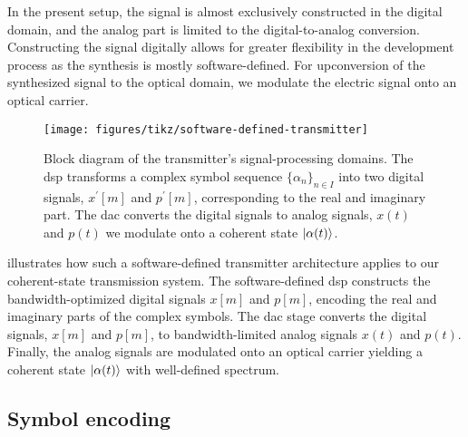 In the present setup, the signal is almost exclusively constructed in the digital domain, and the analog part is limited to the digital-to-analog conversion.
Constructing the signal digitally allows for greater flexibility in the development process as the synthesis is mostly software-defined.
For upconversion of the synthesized signal to the optical domain, we modulate the electric signal onto an optical carrier.
\begin{figure}[htb]
	\centering
	\texttt{[image: figures/tikz/software-defined-transmitter]}
	\caption{Block diagram of the transmitter's signal-processing domains. The \gls{dsp} transforms a complex symbol sequence $\{\alpha_n\}_{n\in I}$ into two digital signals, $x^\prime[m]$ and $p^\prime[m]$, corresponding to the real and imaginary part. The \gls{dac} converts the digital signals to analog signals, $x(t)$ and $p(t)$ we modulate onto a coherent state $\lvert\alpha(t)\rangle$.}\label{fig:software_defined_transmitter}
\end{figure}
 illustrates how such a software-defined transmitter architecture applies to our coherent-state transmission system.
The software-defined \gls{dsp} constructs the bandwidth-optimized digital signals $x[m]$ and $p[m]$, encoding the real and imaginary parts of the complex symbols.
The \gls{dac} stage converts the digital signals, $x[m]$ and $p[m]$, to bandwidth-limited analog signals $x(t)$ and $p(t)$.
Finally, the analog signals are modulated onto an optical carrier yielding a coherent state $\lvert\alpha(t)\rangle$ with well-defined spectrum.

\subsection{Symbol encoding}


